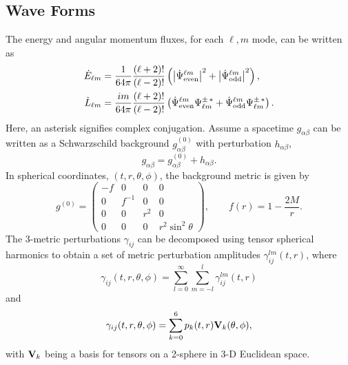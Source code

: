 \documentclass{article}
\begin{document}
\subsection{Wave Forms}

The energy and angular 
momentum fluxes, for each $\ell, m$ mode, can be written as \cite{Thorne_1980}
\begin{align}
\label{eq:EAndLDot}
\dot E_{\ell m} &= \frac{1}{64 \pi} 
\frac{(\ell+2)!}{(\ell-2)!} 
\left(
\left| \dot \Psi^{\ell m}_{\rm even} \right|^2
+
\left| \dot \Psi^{\ell m}_{\rm odd} \right|^2
\right), \\ 
\dot L_{\ell m} &= 
\frac{ i m }{64 \pi} \frac{(\ell+2)!}{(\ell-2)!} 
\left(
 \dot \Psi^{\ell m}_{\rm even}  \Psi^{\pm \, *}_{\ell m} 
+
 \dot \Psi^{\ell m}_{\rm odd}  \Psi^{\pm \, *}_{\ell m} 
\right).
\end{align}
Here, an asterisk signifies complex conjugation. 
Assume a spacetime $g_{\alpha\beta}$ can be written as a Schwarzschild background
$g_{\alpha\beta}^{(0)}$ with perturbation $h_{\alpha\beta}$,
\begin{equation}
g_{\alpha\beta} = g^{(0)}_{\alpha\beta} + h_{\alpha\beta}.
\end{equation}
In spherical coordinates, $(t,r,\theta,\phi)$, the background metric is given by
\begin{equation}
g^{(0)} = 
\left( \begin{array}{cccc}
 -f & 0      & 0   & 0                \\
 0  & f^{-1} & 0   & 0                \\
 0  & 0      & r^2 & 0                \\
 0  & 0      & 0   & r^2 \sin^2\theta
\end{array}\right),
\qquad
f(r)=1-\frac{2M}{r}.
\end{equation}
The 3-metric perturbations $\gamma_{ij}$ can be decomposed using tensor spherical harmonics to
obtain a set of metric perturbation amplitudes $\gamma_{ij}^{lm}(t,r)$, where
$$
  \gamma_{ij}(t,r,\theta,\phi)=\sum_{l=0}^\infty \sum_{m=-l}^l
                       \gamma_{ij}^{lm}(t,r)
$$
and
$$
  \gamma_{ij}(t,r,\theta,\phi) = \sum_{k=0}^6 p_k(t,r) {\bf V}_k(\theta,\phi),
$$
with ${\bf V}_k$ being a basis for tensors on a 2-sphere in 3-D Euclidean space.
\end{document}
